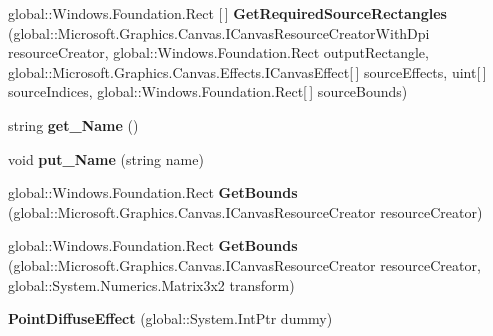 \begin{DoxyCompactItemize}
global\+::\+Windows.\+Foundation.\+Rect \mbox{[}$\,$\mbox{]} {\bfseries Get\+Required\+Source\+Rectangles} (global\+::\+Microsoft.\+Graphics.\+Canvas.\+I\+Canvas\+Resource\+Creator\+With\+Dpi resource\+Creator, global\+::\+Windows.\+Foundation.\+Rect output\+Rectangle, global\+::\+Microsoft.\+Graphics.\+Canvas.\+Effects.\+I\+Canvas\+Effect\mbox{[}$\,$\mbox{]} source\+Effects, uint\mbox{[}$\,$\mbox{]} source\+Indices, global\+::\+Windows.\+Foundation.\+Rect\mbox{[}$\,$\mbox{]} source\+Bounds)
\item 
\mbox{\label{class_microsoft_1_1_graphics_1_1_canvas_1_1_effects_1_1_point_diffuse_effect_a30a5168ffb6294e4382215f72ffc6c43}} 
string {\bfseries get\+\_\+\+Name} ()
\item 
\mbox{\label{class_microsoft_1_1_graphics_1_1_canvas_1_1_effects_1_1_point_diffuse_effect_a7859ce70aa004a985213e13d24077993}} 
void {\bfseries put\+\_\+\+Name} (string name)
\item 
\mbox{\label{class_microsoft_1_1_graphics_1_1_canvas_1_1_effects_1_1_point_diffuse_effect_a4ea41fe2e96af16d284ce3c8fed52889}} 
global\+::\+Windows.\+Foundation.\+Rect {\bfseries Get\+Bounds} (global\+::\+Microsoft.\+Graphics.\+Canvas.\+I\+Canvas\+Resource\+Creator resource\+Creator)
\item 
\mbox{\label{class_microsoft_1_1_graphics_1_1_canvas_1_1_effects_1_1_point_diffuse_effect_a7e675ad720b1c7fd2661be4a4e964855}} 
global\+::\+Windows.\+Foundation.\+Rect {\bfseries Get\+Bounds} (global\+::\+Microsoft.\+Graphics.\+Canvas.\+I\+Canvas\+Resource\+Creator resource\+Creator, global\+::\+System.\+Numerics.\+Matrix3x2 transform)
\item 
\mbox{\label{class_microsoft_1_1_graphics_1_1_canvas_1_1_effects_1_1_point_diffuse_effect_a339b570af9f36502e7a354c01bdefc1a}} 
{\bfseries Point\+Diffuse\+Effect} (global\+::\+System.\+Int\+Ptr dummy)
\item 
\mbox{\label{class_microsoft_1_1_graphics_1_1_canvas_1_1_effects_1_1_point_diffuse_effect_aab9fe4ed8a06cb7b338c2b768c889cc4}} 

\end{DoxyCompactItemize}

